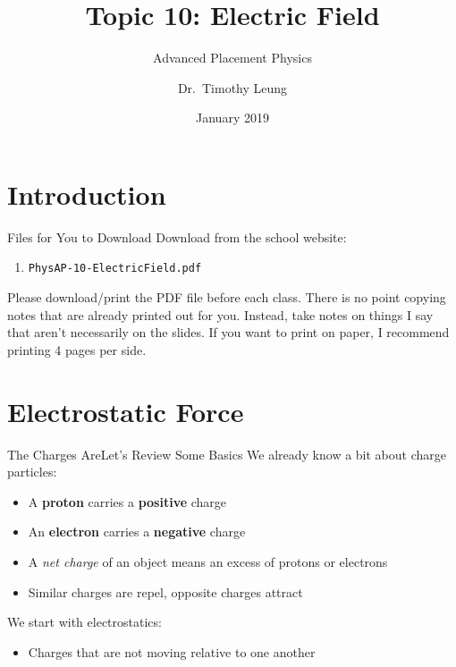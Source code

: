 \documentclass[12pt,aspectratio=169]{beamer}
\title{Topic 10: Electric Field}
\subtitle{Advanced Placement Physics}
\author[TML]{Dr.\ Timothy Leung}
\institute{Olympiads School}
\date{January 2019}
\newcommand{\mb}[1]{\mathbf{#1}}
\begin{document}
\begin{frame}
  \maketitle
\end{frame}



\section[Intro]{Introduction}

\begin{frame}{Files for You to Download}
  Download from the school website:
  \begin{enumerate}
  \item\texttt{PhysAP-10-ElectricField.pdf}
  \end{enumerate}
  Please download/print the PDF file before each class. There is no point
  copying notes that are already printed out for you. Instead, take notes on
  things I say that aren't necessarily on the slides. If you want to print
  on paper, I recommend printing 4 pages per side.
\end{frame}



\section[$\mb{F}_q$]{Electrostatic Force}

\begin{frame}{The Charges Are}{Let's Review Some Basics}
  We already know a bit about charge particles:
  \begin{itemize}
  \item A \textbf{proton} carries a \textbf{positive} charge
  \item An \textbf{electron} carries a \textbf{negative} charge
  \item A \emph{net charge} of an object means an excess of protons or electrons
  \item Similar charges are repel, opposite charges attract
  \end{itemize}

  \vspace{.2in}We start with electrostatics:
  \begin{itemize}
  \item Charges that are not moving relative to one another
  \end{itemize}
\end{frame}
\end{document}
